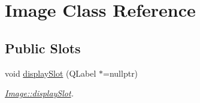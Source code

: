 \hypertarget{class_image}{}\section{Image Class Reference}
\label{class_image}
\subsection*{Public Slots}
\begin{DoxyCompactItemize}
\item 
void \mbox{\hyperlink{class_image_a0d6d6b06c139bcecada54f98122ccb69}{display\+Slot}} (Q\+Label $\ast$=nullptr)
\begin{DoxyCompactList}\small\item\em \mbox{\hyperlink{class_image_a0d6d6b06c139bcecada54f98122ccb69}{Image\+::display\+Slot}}. \end{DoxyCompactList}\end{DoxyCompactItemize}
